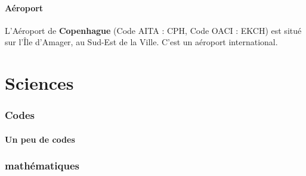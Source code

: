 \documentclass[a4paper,10pt,openany]{memoir}
\begin{document}
\subsection{Aéroport}
L'Aéroport de \textbf{Copenhague} (Code AITA : CPH, Code OACI : EKCH) est situé sur l'Île d'Amager, 
au Sud-Est de la Ville. C'est un aéroport international.

\part{Sciences}

\section{Codes}
\subsection{Un peu de codes}

\begin{framed}

\end{framed}
\section{mathématiques}
\end{document}
